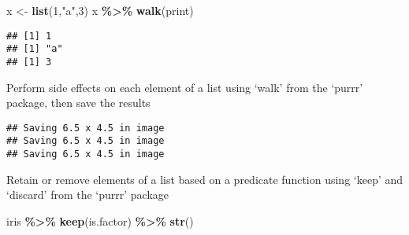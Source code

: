 \documentclass[
]{article}
\newenvironment{Shaded}{\begin{snugshade}}{\end{snugshade}}
\newcommand{\AttributeTok}[1]{\textcolor[rgb]{0.13,0.29,0.53}{#1}}
\newcommand{\DecValTok}[1]{\textcolor[rgb]{0.00,0.00,0.81}{#1}}
\newcommand{\FunctionTok}[1]{\textcolor[rgb]{0.13,0.29,0.53}{\textbf{#1}}}
\newcommand{\NormalTok}[1]{#1}
\newcommand{\OtherTok}[1]{\textcolor[rgb]{0.56,0.35,0.01}{#1}}
\newcommand{\SpecialCharTok}[1]{\textcolor[rgb]{0.81,0.36,0.00}{\textbf{#1}}}
\newcommand{\StringTok}[1]{\textcolor[rgb]{0.31,0.60,0.02}{#1}}
\begin{document}
\begin{Shaded}
\begin{Highlighting}[]
\NormalTok{x }\OtherTok{\textless{}{-}} \FunctionTok{list}\NormalTok{(}\DecValTok{1}\NormalTok{,}\StringTok{"a"}\NormalTok{,}\DecValTok{3}\NormalTok{)}
\NormalTok{x }\SpecialCharTok{\%\textgreater{}\%} 
  \FunctionTok{walk}\NormalTok{(print)}
\end{Highlighting}
\end{Shaded}

\begin{verbatim}
## [1] 1
## [1] "a"
## [1] 3
\end{verbatim}

Perform side effects on each element of a list using `walk' from the
`purrr' package, then save the results

\begin{Shaded}
\end{Shaded}

\begin{verbatim}
## Saving 6.5 x 4.5 in image
## Saving 6.5 x 4.5 in image
## Saving 6.5 x 4.5 in image
\end{verbatim}

Retain or remove elements of a list based on a predicate function using
`keep' and `discard' from the `purrr' package

\begin{Shaded}
\begin{Highlighting}[]
\NormalTok{iris }\SpecialCharTok{\%\textgreater{}\%} 
  \FunctionTok{keep}\NormalTok{(is.factor) }\SpecialCharTok{\%\textgreater{}\%} 
  \FunctionTok{str}\NormalTok{()}
\end{Highlighting}
\end{Shaded}
\end{document}
